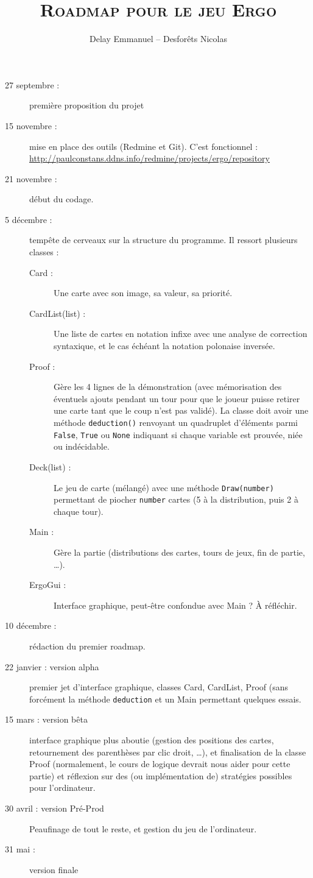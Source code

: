 \documentclass[12pt]{cours}
\title{\textbf{\textsc{Roadmap pour le jeu Ergo}}}
\author{Delay Emmanuel -- Desforêts Nicolas}
\begin{document}
\maketitle

\begin{description}
\item[27 septembre :] première proposition du projet
\item[15 novembre :] mise en place des outils (Redmine et Git). C'est fonctionnel : \url{http://paulconstans.ddns.info/redmine/projects/ergo/repository}
\item[21 novembre :] début du codage.
\item[5 décembre :] tempête de cerveaux sur la structure du programme. Il ressort plusieurs classes :

\begin{description}
\item[Card :] Une carte avec son image, sa valeur, sa priorité.
\item[CardList(list) :] Une liste de cartes en notation infixe avec une analyse de correction syntaxique, et le cas échéant la notation polonaise inversée.
\item[Proof : ] Gère les 4 lignes de la démonstration (avec mémorisation des éventuels ajouts pendant un tour pour que le joueur puisse retirer une carte tant que le coup n'est pas validé). La classe doit avoir une méthode \texttt{deduction()} renvoyant un quadruplet d'éléments parmi \texttt{False}, \texttt{True} ou \texttt{None} indiquant si chaque variable est prouvée, niée ou indécidable.
\item[Deck(list) :] Le jeu de carte (mélangé) avec une méthode \texttt{Draw(number)} permettant de piocher \texttt{number} cartes (5 à la distribution, puis 2 à chaque tour).
\item[Main :] Gère la partie (distributions des cartes, tours de jeux, fin de partie, \dots).
\item[ErgoGui :] Interface graphique, peut-être confondue avec Main ? À réfléchir.
\end{description}
\item[10 décembre :] rédaction du premier roadmap.
\item[22 janvier : version alpha]  premier jet d'interface graphique, classes Card, CardList, Proof (sans forcément la méthode \texttt{deduction} et un Main permettant quelques essais.
\item[15 mars : version bêta] interface graphique plus aboutie (gestion des positions des cartes, retournement des parenthèses par clic droit, \dots), et finalisation de la classe Proof (normalement, le cours de logique devrait nous aider pour cette partie) et réflexion sur des (ou implémentation de) stratégies possibles pour l'ordinateur.
\item[30 avril : version Pré-Prod] Peaufinage de tout le reste, et gestion du jeu de l'ordinateur.
\item[31 mai :] version finale
\end{description}
\end{document}
